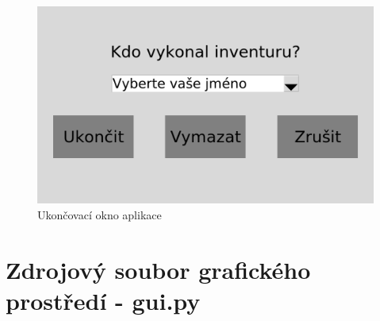 \begin{figure}[H]
    \begin{center}
        \includegraphics[scale=0.4]{obrazky/GUI Konec inventury.png}
    \end{center}
    \caption{Ukončovací okno aplikace}
    \label{Ukončovací okno aplikace}
\end{figure}


\section{Zdrojový soubor grafického prostředí - gui.py}

